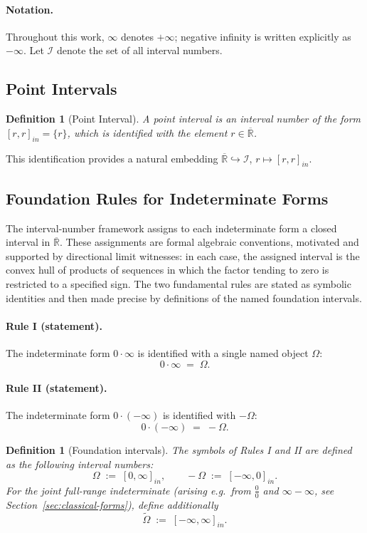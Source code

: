 \documentclass[11pt,a4paper]{article}
\theoremstyle{paperdef}
\newtheorem{definition}[theorem]{Definition}
\newcommand{\Rext}{\overline{\mathbb{R}}}
\newcommand{\Iset}{\mathcal{I}}
\newcommand{\inI}[1]{[#1]_{in}}
\begin{document}
\paragraph{Notation.} Throughout this work, $\infty$ denotes
$+\infty$; negative infinity is written explicitly as $-\infty$. Let
$\Iset$ denote the set of all interval numbers.

\subsection{Point Intervals}

\begin{definition}[Point Interval]\label{def:point-interval}
A point interval is an interval number of the form
$\inI{r, r} = \{r\}$, which is identified with the element
$r \in \Rext$.
\end{definition}

This identification provides a natural embedding
$\Rext \hookrightarrow \Iset$, $r \mapsto \inI{r, r}$.

\subsection{Foundation Rules for Indeterminate Forms}\label{sec:foundation-rules}

The interval-number framework assigns to each indeterminate form a
closed interval in $\Rext$. These assignments are formal algebraic
conventions, motivated and supported by directional limit witnesses:
in each case, the assigned interval is the convex hull of products of
sequences in which the factor tending to zero is restricted to a
specified sign. The two fundamental rules are stated as symbolic
identities and then made precise by definitions of the named
foundation intervals.

\paragraph{Rule I (statement).} The indeterminate form
$0 \cdot \infty$ is identified with a single named object $\Omega$:
\[
0 \cdot \infty \;=\; \Omega.
\]

\paragraph{Rule II (statement).} The indeterminate form
$0 \cdot (-\infty)$ is identified with $-\Omega$:
\[
0 \cdot (-\infty) \;=\; -\Omega.
\]

\begin{definition}[Foundation intervals]\label{def:foundation-intervals}
The symbols of Rules I and II are defined as the following interval
numbers:
\[
\Omega \;:=\; \inI{0, \infty},\qquad
-\Omega \;:=\; \inI{-\infty, 0}.
\]
For the joint full-range indeterminate (arising e.g.\ from
$\tfrac{0}{0}$ and $\infty - \infty$, see
Section~\ref{sec:classical-forms}), define additionally
\[
\widetilde{\Omega} \;:=\; \inI{-\infty, \infty}.
\]
\end{definition}
\end{document}
